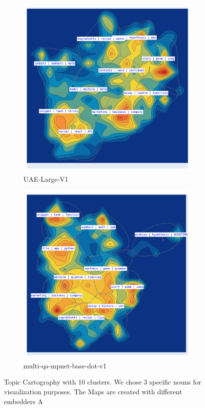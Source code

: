 \documentclass{article}
\begin{document}
\begin{figure}
 \medskip
 \begin{subfigure}{0.49\textwidth}
     \centering
     \includegraphics[width=\linewidth]{img/maps/UAE-Large-V1plot.png}
     \caption{UAE-Large-V1}
     \label{fig:c}
 \end{subfigure}
 \hfill
 \begin{subfigure}{0.49\textwidth}
     \centering
     \includegraphics[width=\linewidth]{img/maps/multi-qa-mpnet-base-dot-v1plot.png}
     \caption{multi-qa-mpnet-base-dot-v1}
     \label{fig:d}
 \end{subfigure}
 \caption{ Topic Cartography with 10 clusters. We chose 3 specific nouns for visualization purposes. The Maps are created with different embedders A} %
\end{figure}
\end{document}
